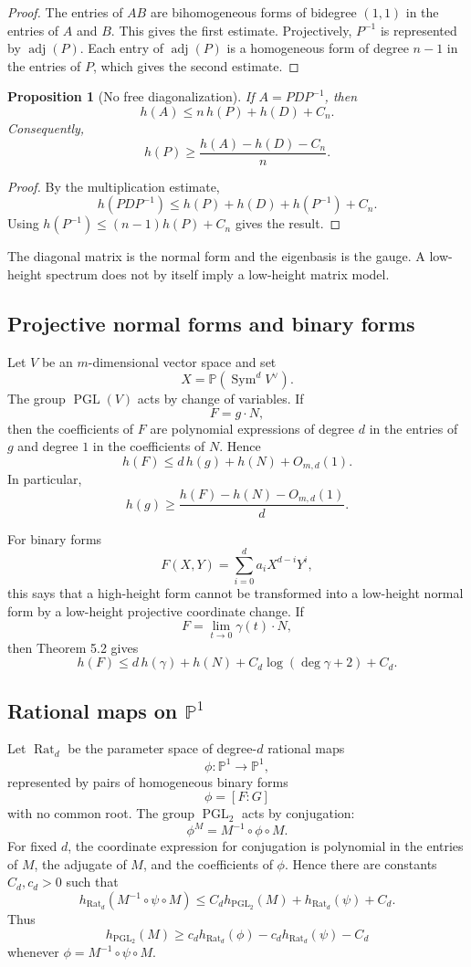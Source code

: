 \documentclass[11pt]{article}
\newtheorem{proposition}[theorem]{Proposition}
\DeclareMathOperator{\PGL}{PGL}
\DeclareMathOperator{\Rat}{Rat}
\DeclareMathOperator{\Sym}{Sym}
\DeclareMathOperator{\adj}{adj}
\begin{document}
\begin{proof}
The entries of \(AB\) are bihomogeneous forms of bidegree \((1,1)\) in the entries of \(A\) and \(B\). This gives the first estimate. Projectively, \(P^{-1}\) is represented by \(\adj(P)\). Each entry of \(\adj(P)\) is a homogeneous form of degree \(n-1\) in the entries of \(P\), which gives the second estimate.
\end{proof}

\begin{proposition}[No free diagonalization]
If \(A=PDP^{-1}\), then
\[
h(A)\leq n\,h(P)+h(D)+C_n.
\]
Consequently,
\[
h(P)\geq \frac{h(A)-h(D)-C_n}{n}.
\]
\end{proposition}

\begin{proof}
By the multiplication estimate,
\[
h(PDP^{-1})
\leq h(P)+h(D)+h(P^{-1})+C_n.
\]
Using \(h(P^{-1})\leq(n-1)h(P)+C_n\) gives the result.
\end{proof}

The diagonal matrix is the normal form and the eigenbasis is the gauge. A low-height spectrum does not by itself imply a low-height matrix model.

\subsection{Projective normal forms and binary forms}

Let \(V\) be an \(m\)-dimensional vector space and set
\[
X=\mathbb P(\Sym^d V^\vee).
\]
The group \(\PGL(V)\) acts by change of variables. If
\[
F=g\cdot N,
\]
then the coefficients of \(F\) are polynomial expressions of degree \(d\) in the entries of \(g\) and degree \(1\) in the coefficients of \(N\). Hence
\[
h(F)\leq d\,h(g)+h(N)+O_{m,d}(1).
\]
In particular,
\[
h(g)\geq \frac{h(F)-h(N)-O_{m,d}(1)}{d}.
\]

For binary forms
\[
F(X,Y)=\sum_{i=0}^d a_iX^{d-i}Y^i,
\]
this says that a high-height form cannot be transformed into a low-height normal form by a low-height projective coordinate change. If
\[
F=\lim_{t\to0}\gamma(t)\cdot N,
\]
then Theorem 5.2 gives
\[
h(F)\leq d\,h(\gamma)+h(N)+C_d\log(\deg\gamma+2)+C_d.
\]

\subsection{Rational maps on \(\mathbb P^1\)}

Let \(\Rat_d\) be the parameter space of degree-\(d\) rational maps
\[
\phi:\mathbb P^1\to\mathbb P^1,
\]
represented by pairs of homogeneous binary forms
\[
\phi=[F:G]
\]
with no common root. The group \(\PGL_2\) acts by conjugation:
\[
\phi^M=M^{-1}\circ\phi\circ M.
\]
For fixed \(d\), the coordinate expression for conjugation is polynomial in the entries of \(M\), the adjugate of \(M\), and the coefficients of \(\phi\). Hence there are constants \(C_d,c_d>0\) such that
\[
h_{\Rat_d}(M^{-1}\circ\psi\circ M)
\leq
C_d h_{\PGL_2}(M)+h_{\Rat_d}(\psi)+C_d.
\]
Thus
\[
h_{\PGL_2}(M)
\geq
c_d h_{\Rat_d}(\phi)
-c_d h_{\Rat_d}(\psi)
-C_d
\]
whenever \(\phi=M^{-1}\circ\psi\circ M\).
\end{document}

